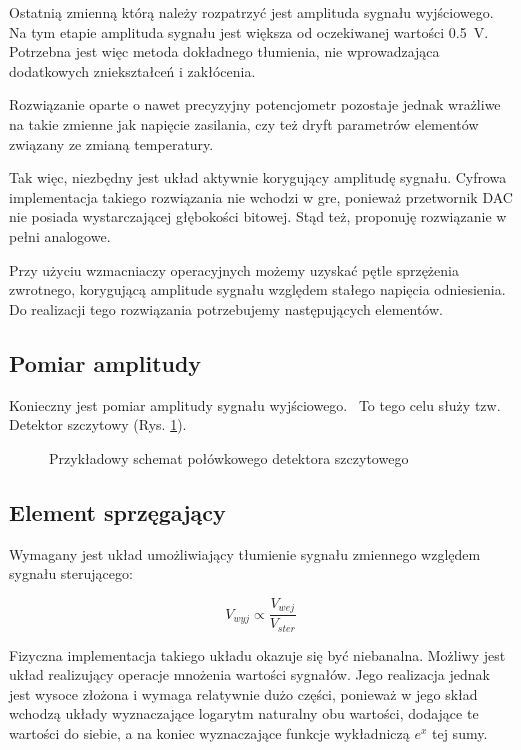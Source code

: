 \documentclass[12pt, a4paper]{article}
\begin{document}
Ostatnią zmienną którą należy rozpatrzyć jest amplituda sygnału wyjściowego. Na tym etapie amplituda sygnału jest większa od oczekiwanej wartości
\qty{0,5}{\V}. Potrzebna jest więc metoda dokładnego tłumienia, nie wprowadzająca dodatkowych zniekształceń i zakłócenia.

Rozwiązanie oparte o nawet precyzyjny potencjometr pozostaje jednak wrażliwe na takie zmienne jak napięcie zasilania, 
czy też dryft parametrów elementów związany ze zmianą temperatury.

Tak więc, niezbędny jest układ aktywnie korygujący amplitudę sygnału.
Cyfrowa implementacja takiego rozwiązania nie wchodzi w gre, 
ponieważ przetwornik DAC nie posiada wystarczającej głębokości bitowej. 
Stąd też, proponuję rozwiązanie w pełni analogowe.

Przy użyciu wzmacniaczy operacyjnych możemy uzyskać pętle sprzężenia zwrotnego, 
korygującą amplitude sygnału względem stałego napięcia odniesienia.
Do realizacji tego rozwiązania potrzebujemy następujących elementów.

\subsection{Pomiar amplitudy}
Konieczny jest pomiar amplitudy sygnału wyjściowego. \
To tego celu służy tzw. Detektor szczytowy (Rys. \ref{fig:peak-detector-schematic}). 

\begin{figure}[h]
	\centering
	
	\caption{Przykładowy schemat połówkowego detektora szczytowego}
	\label{fig:peak-detector-schematic}
\end{figure}

\subsection{Element sprzęgający}
Wymagany jest układ umożliwiający tłumienie sygnału zmiennego względem sygnału sterującego:

\begin{equation}
	V_{wyj} \propto \frac{V_{wej}}{V_{ster}}
	\label{eq:coupling_1}
\end{equation}

Fizyczna implementacja takiego układu okazuje się być niebanalna.
Możliwy jest układ realizujący operacje mnożenia wartości sygnałów. 
Jego realizacja jednak jest wysoce złożona i wymaga relatywnie dużo części, 
ponieważ w jego skład wchodzą układy wyznaczające logarytm naturalny obu wartości, dodające te wartości do siebie,
a na koniec wyznaczające funkcje wykładniczą $e^x$ tej sumy.
\end{document}
